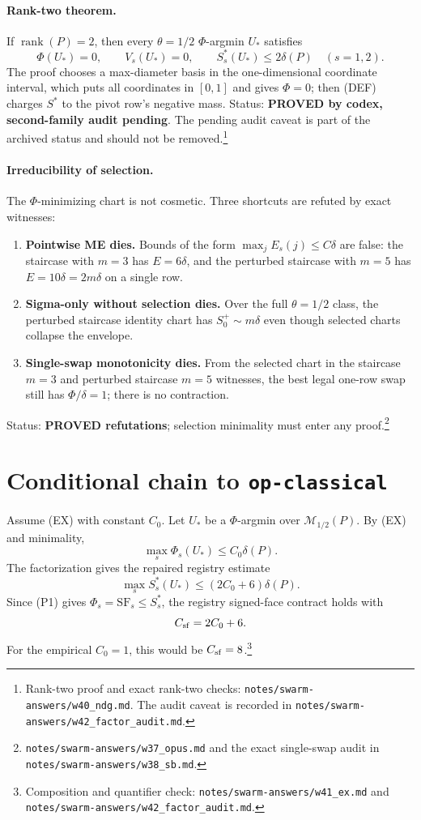 \documentclass[11pt]{article}
\theoremstyle{plain}
\theoremstyle{definition}
\theoremstyle{remark}
\newcommand{\rank}{\operatorname{rank}}
\begin{document}
\paragraph{Rank-two theorem.}
If $\rank(P)=2$, then every $\theta=1/2$ $\Phi$-argmin $U_*$ satisfies
\[
\Phi(U_*)=0,\qquad V_s(U_*)=0,\qquad S^*_s(U_*)\le2\delta(P)\quad(s=1,2).
\]
The proof chooses a max-diameter basis in the one-dimensional coordinate
interval, which puts all coordinates in $[0,1]$ and gives $\Phi=0$; then (DEF)
charges $S^*$ to the pivot row's negative mass.  Status:
\textbf{PROVED by codex, second-family audit pending}.  The pending audit caveat
is part of the archived status and should not be removed.\footnote{Rank-two
proof and exact rank-two checks:
\texttt{notes/swarm-answers/w40\_ndg.md}.  The audit caveat is recorded in
\texttt{notes/swarm-answers/w42\_factor\_audit.md}.}

\paragraph{Irreducibility of selection.}
The $\Phi$-minimizing chart is not cosmetic.  Three shortcuts are refuted by
exact witnesses:
\begin{enumerate}
\item \textbf{Pointwise ME dies.}  Bounds of the form
$\max_jE_s(j)\le C\delta$ are false: the staircase with $m=3$ has
$E=6\delta$, and the perturbed staircase with $m=5$ has
$E=10\delta=2m\delta$ on a single row.
\item \textbf{Sigma-only without selection dies.}  Over the full
$\theta=1/2$ class, the perturbed staircase identity chart has
$S^+_0\sim m\delta$ even though selected charts collapse the envelope.
\item \textbf{Single-swap monotonicity dies.}  From the selected chart in the
staircase $m=3$ and perturbed staircase $m=5$ witnesses, the best legal
one-row swap still has $\Phi/\delta=1$; there is no contraction.
\end{enumerate}
Status: \textbf{PROVED refutations}; selection minimality must enter any
proof.\footnote{\texttt{notes/swarm-answers/w37\_opus.md} and the exact
single-swap audit in \texttt{notes/swarm-answers/w38\_sb.md}.}

\section{Conditional chain to \texttt{op-classical}}

Assume \textup{(EX)} with constant $C_0$.  Let $U_*$ be a
$\Phi$-argmin over $\mathcal M_{1/2}(P)$.  By \textup{(EX)} and minimality,
\[
\max_s\Phi_s(U_*)\le C_0\delta(P).
\]
The factorization gives the repaired registry estimate
\[
\max_sS^*_s(U_*)\le (2C_0+6)\delta(P).
\]
Since (P1) gives $\Phi_s=\mathrm{SF}_s\le S^*_s$, the registry signed-face
contract holds with
\[
C_{\rm sf}=2C_0+6.
\]
For the empirical $C_0=1$, this would be $C_{\rm sf}=8$.\footnote{Composition
and quantifier check: \texttt{notes/swarm-answers/w41\_ex.md} and
\texttt{notes/swarm-answers/w42\_factor\_audit.md}.}
\end{document}

